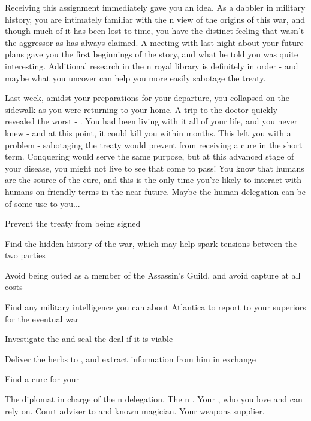 \documentclass[char]{NeptuneBall}
\begin{document}
Receiving this assignment immediately gave you an idea. As a dabbler in military history, you are intimately familiar with the \pPacifica{}n view of the origins of this war, and though much of it has been lost to time, you have the distinct feeling that \pPacifica{} wasn't the aggressor as \pAtlantis{} has always claimed. A meeting with \cManta{} last night about your future plans gave you the first beginnings of the story, and what he told you was quite interesting. Additional research in the \pAtlantis{}n royal library is definitely in order - and maybe what you uncover can help you more easily sabotage the treaty. 

Last week, amidst your preparations for your departure, you collapsed on the sidewalk as you were returning to your home. A trip to the doctor quickly revealed the worst - \pPolio{}. You had been living with it all of your life, and you never knew - and at this point, it could kill you within months. This left you with a problem - sabotaging the treaty would prevent \pPacifica{} from receiving a cure in the short term. Conquering \pAtlantis{} would serve the same purpose, but at this advanced stage of your disease, you might not live to see that come to pass! You know that humans are the source of the cure, and this is the only time you're likely to interact with humans on friendly terms in the near future. Maybe the human delegation can be of some use to you...

\begin{itemz}[Goals]
	\item Prevent the treaty from being signed
	\item Find the hidden history of the war, which may help spark tensions between the two parties
	\item Avoid being outed as a member of the Assassin's Guild, and avoid capture at all costs
  \item Find any military intelligence you can about Atlantica to report to your superiors for the eventual war
	\item Investigate the \iPrototype{} and seal the deal if it is viable
	\item Deliver the herbs to \cManta{}, and extract information from him in exchange
	\item Find a cure for your \pPolio{}

\end{itemz}

\begin{contacts}
	\contact{\cDiplomat{}} The diplomat in charge of the \pPacifica{}n delegation.
	\contact{\cPrince{}} The \pPacifica{}n \cPrince{\Prince}.
  \contact{\cBodyguard{}} Your \cSpy{\sibling}, who you love and can rely on.
	\contact{\cManta{}} Court adviser to \cKing{\King} \cKing{} and known magician.
	\contact{\cGeneral{}} Your weapons supplier.
\end{contacts}
\end{document}
